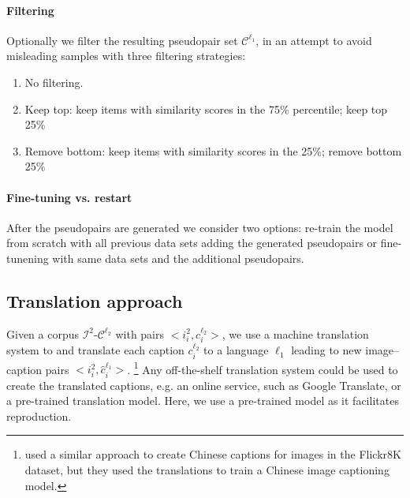 \begin{comment}

\paragraph{2. Image-similarities} are the second option we explored. 
This approach is the same as the sentence similarities just the other way 
around as in as shown in Algorithm~\ref{alg:imgsim}.
\begin{algorithm}
\begin{algorithmic}
\State $pseudo\_imgs \Leftarrow [\;]$
\For{$i_2 \in D_2$} 
    \State $\hat{i_1}$ = arg max $sim(i_2, I_1)$
    \State $pseudo\_imgs$.add($\hat{i_1}$)
\EndFor
\end{algorithmic}
\caption{Pseudo-pairs based on image-similarities.}
\label{alg:imgsim}
\end{algorithm}
\end{comment}

\paragraph{Filtering}

Optionally we filter 
the resulting pseudopair set $\mathcal{C}^{\ell_1}$, in an attempt to
avoid misleading samples with three filtering strategies:

\begin{enumerate}
    \item No filtering.
    \item Keep top: keep items with similarity scores in the 75\% percentile; keep top 25\% 
    \item Remove bottom: keep items with similarity scores in the 25\%; remove bottom 25\%
\end{enumerate}

\paragraph{Fine-tuning vs. restart}
After the pseudopairs are generated we consider two 
options: re-train the model from scratch with all previous 
data sets adding the generated pseudopairs or fine-tunening with
same data sets and the additional pseudopairs.


\subsection{Translation approach}\label{sec:method:mt}
Given a corpus  
$\mathcal{I}^2$-$\mathcal{C}^{\ell_2}$ with pairs 
$<i^2_i, c^{\ell_2}_i>$, we use a machine 
translation system 
to and translate each caption $c^{\ell_2}_i$ to a language $\ell_1$ leading to new image--caption pairs 
$<i^2_i, \hat{c}^{\ell_1}_i>$.
\footnote{\cite{li2016adding} used a similar approach to create Chinese captions for images in the Flickr8K dataset, but they used the translations to train a Chinese image captioning model.} 
Any off-the-shelf translation system could be used to create the translated captions, e.g. an online service, such as Google Translate, or a pre-trained translation model. Here, we use a pre-trained model as it facilitates reproduction. 

